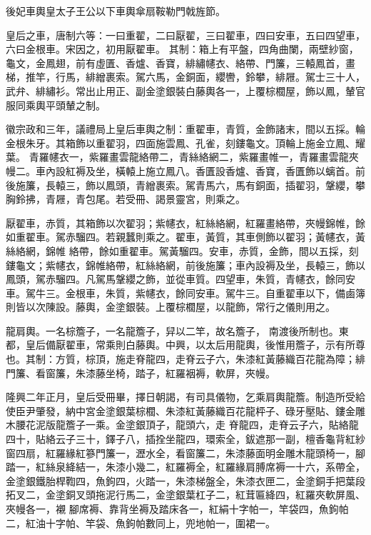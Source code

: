 
\begin{pinyinscope}

 後妃車輿皇太子王公以下車輿傘扇鞍勒門戟旌節。



 皇后之車，唐制六等：一曰重翟，二曰厭翟，三曰翟車，四曰安車，五曰四望車，六曰金根車。宋因之，初用厭翟車。
 其制：箱上有平盤，四角曲闌，兩壁紗窗，龜文，金鳳翅，前有虛匱、香爐、香寶，緋繡幰衣、絡帶、門簾，三轅鳳首，畫梯，推竿，行馬，緋繒裹索。駕六馬，金銅面，纓轡，鈴攀，緋屜。駕士三十人，武弁、緋繡衫。常出止用正、副金塗銀裝白藤輿各一，上覆棕櫚屋，飾以鳳，輦官服同乘輿平頭輦之制。



 徽宗政和三年，議禮局上皇后車輿之制：重翟車，青質，金飾諸末，間以五採。輪金根朱牙。其箱飾以重翟羽，四面施雲鳳、孔雀，刻鏤龜文。頂輪上施金立鳳、耀葉。
 青羅幰衣一，紫羅畫雲龍絡帶二，青絲絡網二，紫羅畫帷一，青羅畫雲龍夾幔二。車內設紅褥及坐，橫轅上施立鳳八。香匱設香爐、香寶，香匱飾以螭首。前後施簾，長轅三，飾以鳳頭，青繒裹索。駕青馬六，馬有銅面，插翟羽，鞶纓，攀胸鈴拂，青屜，青包尾。若受冊、謁景靈宮，則乘之。



 厭翟車，赤質，其箱飾以次翟羽；紫幰衣，紅絲絡網，紅羅畫絡帶，夾幔錦帷，餘如重翟車。駕赤騮四。若親蠶則乘之。翟車，黃質，其車側飾以翟羽；黃幰衣，黃絲絡網，錦帷
 絡帶，餘如重翟車。駕黃騮四。安車，赤質，金飾，間以五採，刻鏤龜文；紫幰衣，錦帷絡帶，紅絲絡網，前後施簾；車內設褥及坐，長轅三，飾以鳳頭，駕赤騮四。凡駕馬鞶纓之飾，並從車質。四望車，朱質，青幰衣，餘同安車。駕牛三。金根車，朱質，紫幰衣，餘同安車。駕牛三。自重翟車以下，備鹵簿則皆以次陳設。藤輿，金塗銀裝。上覆棕櫚屋，以龍飾，常行之儀則用之。



 龍肩輿。一名棕簷子，一名龍簷子，舁以二竿，故名簷子，
 南渡後所制也。東都，皇后備厭翟車，常乘則白藤輿。中興，以太后用龍輿，後惟用簷子，示有所尊也。其制：方質，棕頂，施走脊龍四，走脊云子六，朱漆紅黃藤織百花龍為障；緋門簾、看窗簾，朱漆藤坐椅，踏子，紅羅裀褥，軟屏，夾幔。



 隆興二年正月，皇后受冊畢，擇日朝謁，有司具儀物，乞乘肩輿龍簷。制造所受給使臣尹肇發，納中宮金塗銀葉棕櫚、朱漆紅黃藤織百花龍枰子、碌牙壓貼、鏤金雕木腰花泥版龍簷子一乘。金塗銀頂子，龍頭六，走
 脊龍四，走脊云子六，貼絡龍四十，貼絡云子三十，鐸子八，插拴坐龍四，環索全，鈸遮那一副，檀香龜背紅紗窗四扇，紅羅緣紅篸門簾一，瀝水全，看窗簾二，朱漆藤面明金雕木龍頭椅一，腳踏一，紅絲泉絳結一，朱漆小幾二，紅羅褥全，紅羅緣肩膊席褥一十六，系帶全，金塗銀鐵胎桿鞫四，魚鉤四，火踏一，朱漆梯盤全，朱漆衣匣二，金塗銅手把葉段拓叉二，金塗銅叉頭拖泥行馬二，金塗銀葉杠子二，紅茸匾絳四，紅羅夾軟屏風、夾幔各一，襯
 腳席褥、靠背坐褥及踏床各一，紅絹十字帕一，竿袋四，魚鉤帕二，紅油十字帕、竿袋、魚鉤帕數同上，兜地帕一，圍裙一。




\end{pinyinscope}
